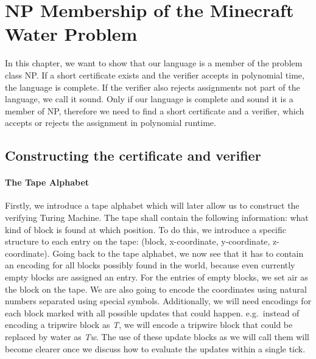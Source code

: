 \section{NP Membership of the Minecraft Water Problem}
	In this chapter, we want to show that our language is a member of the problem class NP. If a short certificate exists and the verifier accepts in polynomial time, the language is complete. If the verifier also rejects assignments not part of the language, we call it sound. Only if our language is complete and sound it is a member of NP, therefore we need to find a short certificate and a verifier, which accepts or rejects the assignment in polynomial runtime.
	
	\subsection{Constructing the certificate and verifier}
	\paragraph{The Tape Alphabet}
	Firstly, we introduce a tape alphabet which will later allow us to construct the verifying Turing Machine. 
	The tape shall contain the following information: what kind of block is found at which position.
	To do this, we introduce a specific structure to each entry on the tape: (block, x-coordinate, y-coordinate, z-coordinate).
	Going back to the tape alphabet, we now see that it has to contain an encoding for all blocks possibly found in the world, because even currently empty blocks are assigned an entry.
 	For the entries of empty blocks, we set air as the block on the tape.
	We are also going to encode the coordinates using natural numbers separated using special symbols.
	Additionally, we will need encodings for each block marked with all possible updates that could happen. 
	e.g.\ instead of encoding a tripwire block as \emph{T}, we will encode a tripwire block that could be replaced by water as \emph{Tw}.
	The use of these update blocks as we will call them will become clearer once we discuss how to evaluate the updates within a single tick.


